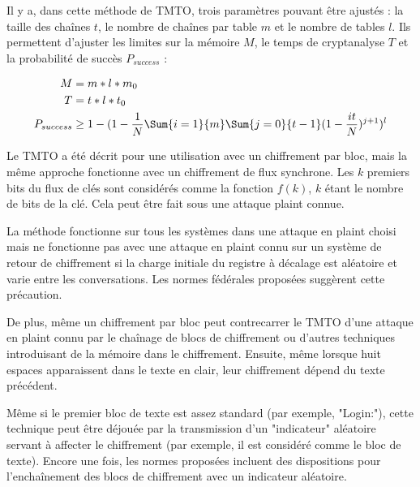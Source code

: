 
		Il y a, dans cette méthode de \gls{TMTO}, trois paramètres pouvant être ajustés : la taille des chaînes $t$, le nombre de chaînes par table $m$ et le nombre de tables $l$. Ils permettent d'ajuster les limites sur la mémoire $M$, le temps de cryptanalyse $T$ et la probabilité de succès $P_{success}$\cite{Oech03} :

		\bigskip

		\begin{align*}
			M &= m*l*m_0\\
			T &= t*l*t_0\\
			P_{success} &\ge{} 1 - (1 - \frac{1}{N} \Sum{i=1}{m}\Sum{j=0}{t-1} (1 - \frac{it}{N})^{j+1})^l
		\end{align*}

		\bigskip

		Le \gls{TMTO} a été décrit pour une utilisation avec un chiffrement par bloc\cite{ehellman}, mais la même approche fonctionne avec un chiffrement de flux synchrone\cite{ehellman}. Les $k$ premiers bits du flux de clés sont considérés comme la fonction $f(k)$, $k$ étant le nombre de bits de la clé. Cela peut être fait sous une attaque \gls{plaint} connue.

		\bigskip

		La méthode fonctionne sur tous les systèmes dans une attaque en \gls{plaint} choisi mais ne fonctionne pas avec une attaque en \gls{plaint} connu sur un système de retour de chiffrement si la charge initiale du registre à décalage est aléatoire et varie entre les conversations. Les normes fédérales proposées\cite{ehellman} suggèrent cette précaution.

		\bigskip

		De plus, même un chiffrement par bloc peut contrecarrer le \gls{TMTO} d'une attaque en \gls{plaint} connu par le chaînage de blocs de chiffrement ou d'autres techniques introduisant de la mémoire dans le chiffrement. Ensuite, même lorsque huit espaces apparaissent dans le texte en clair, leur chiffrement dépend du texte précédent.

		\bigskip

		Même si le premier bloc de texte est assez standard (par exemple, "Login:"), cette technique peut être déjouée par la transmission d'un "indicateur" aléatoire servant à affecter le chiffrement (par exemple, il est considéré comme le bloc de texte). Encore une fois, les normes proposées\cite{ehellman} incluent des dispositions pour l'enchaînement des blocs de chiffrement avec un indicateur aléatoire.

